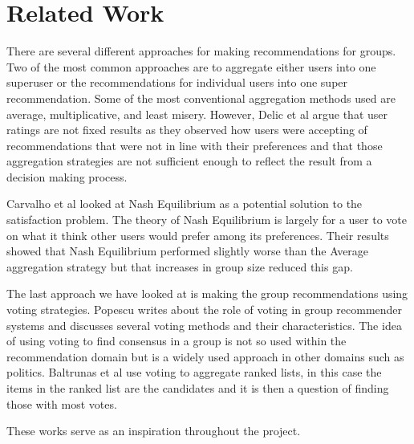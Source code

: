 \section{Related Work} \label{in:related_work}

There are several different approaches for making recommendations for groups. Two of the most common approaches are to aggregate either users into one superuser or the recommendations for individual users into one super recommendation\cite{recsyshandbookagreggation}\cite{deCampos2009}\cite{Christensen201114127}. Some of the most conventional aggregation methods used are average, multiplicative, and least misery. However, Delic et al argue that user ratings are not fixed results as they observed how users were accepting of recommendations that were not in line with their preferences and that those aggregation strategies are not sufficient enough to reflect the result from a decision making process\cite{aggregationnotenough}.

Carvalho et al looked at Nash Equilibrium as a potential solution to the satisfaction problem\cite{nashequilibrium}. The theory of Nash Equilibrium is largely for a user to vote on what it think other users would prefer among its preferences. Their results showed that Nash Equilibrium performed slightly worse than the Average aggregation strategy but that increases in group size reduced this gap.

The last approach we have looked at is making the group recommendations using voting strategies. Popescu writes about the role of voting in group recommender systems and discusses several voting methods and their characteristics. The idea of using voting to find consensus in a group is not so used within the recommendation domain but is a widely used approach in other domains such as politics\cite{Popescu2013}. Baltrunas et al use voting to aggregate ranked lists, in this case the items in the ranked list are the candidates and it is then a question of finding those with most votes\cite{baltrunas}.

These works serve as an inspiration throughout the project.


